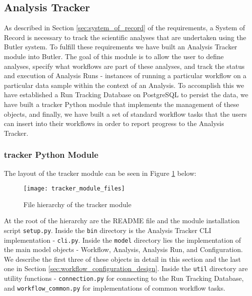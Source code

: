 \subsection{Analysis Tracker} 
\label{sec:analysis_tracker}

As described in Section \ref{sec:system_of_record} of the requirements, a System of Record is necessary to track the scientific analyses that are undertaken using the Butler system. To fulfill these requirements we have built an Analysis Tracker module into Butler. The goal of this module is to allow the user to define analyses, specify what workflows are part of these analyses, and track the status and execution of Analysis Runs - instances of running a particular workflow on a particular data sample within the context of an Analysis. To accomplish this we have established a Run Tracking Database on PostgreSQL to persist the data, we have built a tracker Python module that implements the management of these objects, and finally, we have built a set of standard workflow tasks that the users can insert into their workflows in order to report progress to the Analysis Tracker.

\subsubsection{tracker Python Module}

The layout of the tracker module can be seen in Figure \ref{fig:tracker_module_files} below:

\begin{figure}[H]
\texttt{[image: tracker\_module\_files]}
\centering
\caption {File hierarchy of the tracker module}
\label{fig:tracker_module_files}
\end{figure}

At the root of the hierarchy are the README file and the module installation script \texttt{setup.py}. Inside the \texttt{bin} directory is the Analysis Tracker CLI implementation - \texttt{cli.py}. Inside the \texttt{model} directory lies the implementation of the main model objects - Workflow, Analysis, Analysis Run, and Configuration. We describe the first three of these objects in detail in this section and the last one in Section \ref{sec:workflow_configuration_design}. Inside the \texttt{util} directory are utility functions -  \texttt{connection.py} for connecting to the Run Tracking Database, and  \texttt{workflow_common.py} for implementations of common workflow tasks.

